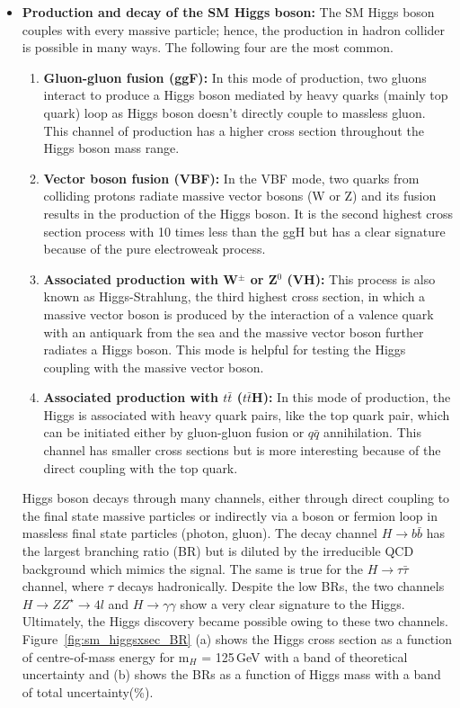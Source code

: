 \begin{itemize}
\item{\textbf{Production and decay of the SM Higgs boson:}} The SM Higgs boson couples with every massive particle; hence, the production in hadron collider is possible in many ways. The following four are the most common.
\begin{enumerate}
\item{\textbf{Gluon-gluon fusion (ggF):}} In this mode of production, two gluons interact to produce a Higgs boson mediated by heavy quarks (mainly top quark) loop as Higgs boson doesn't directly couple to massless gluon. This channel of production has a higher cross section throughout the Higgs boson mass range.
\item{\textbf{Vector boson fusion (VBF):}} In the VBF mode, two quarks from colliding protons radiate massive vector bosons (W or Z) and its fusion results in the production of the Higgs boson. It is the second highest cross section process with 10 times less than the ggH but has a clear signature because of the pure electroweak process. 
\item{\textbf{Associated production with W$^{\pm}$ or Z$^{0}$ (VH):}} This process is also known as Higgs-Strahlung, the third highest cross section, in which a massive vector boson is produced by the interaction of a valence quark with an antiquark from the sea and the massive vector boson further radiates a Higgs boson. This mode is helpful for testing the Higgs coupling with the massive vector boson.
\item{\textbf{Associated production with $t\bar{t}$ ($t\bar{t}$H):}} In this mode of production, the Higgs is associated with heavy quark pairs, like the top quark pair, which can be initiated either by gluon-gluon fusion or $q\bar{q}$ annihilation. This channel has smaller cross sections but is more interesting because of the direct coupling with the top quark.
\end{enumerate} 
Higgs boson decays through many channels, either through direct coupling to the final state massive particles or indirectly via a boson or fermion loop in massless final state particles (photon, gluon). The decay channel $H\rightarrow b\bar{b}$ has the largest branching ratio (BR) but is diluted by the irreducible QCD background which mimics the signal. The same is true for the $H\rightarrow \tau\bar{\tau}$ channel, where $\tau$ decays hadronically. Despite the low BRs, the two channels $H\rightarrow ZZ^{\star}\rightarrow 4l$ and $H\rightarrow \gamma\gamma$ show a very clear signature to the Higgs. Ultimately, the Higgs discovery became possible owing to these two channels. Figure~\ref{fig:sm_higgsxsec_BR} (a) shows the Higgs cross section as a function of centre-of-mass energy for m$_{H}$ = 125\,GeV with a band of theoretical uncertainty and (b) shows the BRs as a function of Higgs mass with a band of total uncertainty(\%).     
\end{itemize} 
